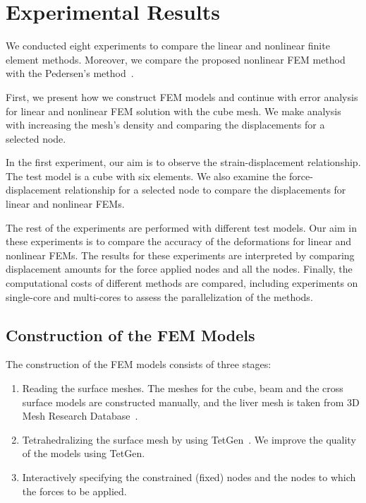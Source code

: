 \chapter{Experimental Results}
\label{chapter6}

We conducted eight experiments to compare the linear and nonlinear finite element methods. Moreover, we compare the proposed nonlinear FEM method with the Pedersen's method~\cite{Pedersen06}.

First, we present how we construct FEM models and continue with error analysis for linear and nonlinear FEM solution with the cube mesh. We make analysis with increasing the mesh's density and comparing the displacements for a selected node.

In the first experiment, our aim is to observe the strain-displacement relationship. The test model is a cube with six elements. We also examine the force-displacement relationship for a selected node to compare the displacements for linear and nonlinear FEMs.

The rest of the experiments are performed with different test models. Our aim in these experiments is to compare the accuracy of the deformations for linear and nonlinear FEMs. The results for these experiments are interpreted by comparing displacement amounts for the force applied nodes and all the nodes. Finally, the computational costs of different methods are compared, including experiments on single-core and multi-cores to assess the parallelization of the methods.

\section{Construction of the FEM Models}

The construction of the FEM models consists of three stages:

\begin{enumerate}
\item Reading the surface meshes. The meshes for the cube, beam and the cross surface models are constructed manually, and the liver mesh is taken from 3D Mesh Research Database~\cite{Liver2011}.

\item Tetrahedralizing the surface mesh by using TetGen~\cite{Tetgen2011}. We improve the quality of the models using TetGen.

\item Interactively specifying the constrained (fixed) nodes and the nodes to which the forces to be applied.
\end{enumerate}

